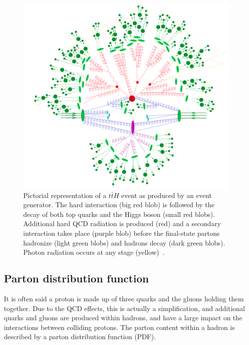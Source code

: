 \begin{figure}[p]
  \centering
  \includegraphics[width=\textwidth, clip=true, trim=0 0 0 0]
  {figs/mc_gen/full_mc_event.png}
  \caption[
    Pictorial representation of a $t\bar{t}H$ event as produced by an event
    generator~\cite{Gleisberg:2008ta}.
  ]{
    Pictorial representation of a $t\bar{t}H$ event as produced by an event
    generator.
    The hard interaction (big red blob) is followed by the decay of both top
    quarks and the Higgs boson (small red blobs).
    Additional hard QCD radiation is produced (red) and a secondary
    interaction takes place (purple blob) before the final-state partons
    hadronize (light green blobs) and hadrons decay (dark green blobs).
    Photon radiation occurs at any stage (yellow)~\cite{Gleisberg:2008ta}.
  }
  \label{fig:mc_event}
\end{figure}

\FloatBarrier
\subsection{Parton distribution function}
\label{sec:pdf}

It is often said a proton is made up of three quarks and the gluons holding
them together.
Due to the QCD effects, this is actually a simplification, and additional
quarks and gluons are produced within hadrons, and have a large impact 
on the interactions between colliding protons.
The parton content within a hadron is described by a parton distribution
function (PDF).

